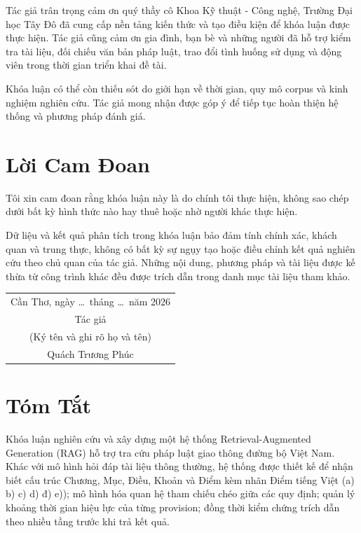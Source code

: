 \documentclass[a4paper,12pt]{extreport}
\newcommand{\StudentName}{Quách Trương Phúc}
\begin{document}
Tác giả trân trọng cảm ơn quý thầy cô Khoa Kỹ thuật - Công nghệ, Trường Đại học Tây Đô đã cung cấp nền tảng kiến thức và tạo điều kiện để khóa luận được thực hiện. Tác giả cũng cảm ơn gia đình, bạn bè và những người đã hỗ trợ kiểm tra tài liệu, đối chiếu văn bản pháp luật, trao đổi tình huống sử dụng và động viên trong thời gian triển khai đề tài.

Khóa luận có thể còn thiếu sót do giới hạn về thời gian, quy mô corpus và kinh nghiệm nghiên cứu. Tác giả mong nhận được góp ý để tiếp tục hoàn thiện hệ thống và phương pháp đánh giá.
\clearpage

\chapter*{Lời Cam Đoan}

Tôi xin cam đoan rằng khóa luận này là do chính tôi thực hiện, không sao chép dưới bất kỳ hình thức nào hay thuê hoặc nhờ người khác thực hiện.

Dữ liệu và kết quả phân tích trong khóa luận bảo đảm tính chính xác, khách quan và trung thực, không có bất kỳ sự ngụy tạo hoặc điều chỉnh kết quả nghiên cứu theo chủ quan của tác giả. Những nội dung, phương pháp và tài liệu được kế thừa từ công trình khác đều được trích dẫn trong danh mục tài liệu tham khảo.

\vspace{36pt}
\begin{flushright}
\begin{tabular}{c}
Cần Thơ, ngày \ldots\ tháng \ldots\ năm 2026\\[24pt]
Tác giả\\[24pt]
(Ký tên và ghi rõ họ và tên)\\[18pt]
\StudentName
\end{tabular}
\end{flushright}
\clearpage

\chapter*{Tóm Tắt}

Khóa luận nghiên cứu và xây dựng một hệ thống Retrieval-Augmented Generation (RAG) hỗ trợ tra cứu pháp luật giao thông đường bộ Việt Nam. Khác với mô hình hỏi đáp tài liệu thông thường, hệ thống được thiết kế để nhận biết cấu trúc Chương, Mục, Điều, Khoản và Điểm kèm nhãn Điểm tiếng Việt (a) b) c) d) đ) e)); mô hình hóa quan hệ tham chiếu chéo giữa các quy định; quản lý khoảng thời gian hiệu lực của từng provision; đồng thời kiểm chứng trích dẫn theo nhiều tầng trước khi trả kết quả.
\end{document}
